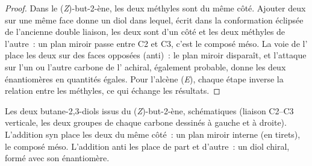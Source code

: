 \begin{proof}
Dans le (\textit{Z})-but-2-ène, les deux méthyles sont du même côté. Ajouter deux  sur une
même face donne un diol dans lequel, écrit dans la conformation éclipsée de l'ancienne double
liaison, les deux  sont d'un côté et les deux méthyles de l'autre~: un plan miroir passe
entre C2 et C3, c'est le composé méso. La voie de l' place les deux  sur des faces
opposées (anti)~: le plan miroir disparaît, et l'attaque sur l'un ou l'autre carbone de l'
achiral, également probable, donne les deux énantiomères en quantités égales. Pour l'alcène
(\textit{E}), chaque étape inverse la relation entre les méthyles, ce qui échange les résultats.
\end{proof}

\begin{omfigure}

{\small Les deux butane-2,3-diols issus du (\textit{Z})-but-2-ène, schématiques (liaison C2--C3
verticale, les deux groupes de chaque carbone dessinés à gauche et à droite). L'addition syn
place les deux  du même côté~: un plan miroir interne (en tirets), le composé méso.
L'addition anti les place de part et d'autre~: un diol chiral, formé avec son énantiomère.}
\end{omfigure}

